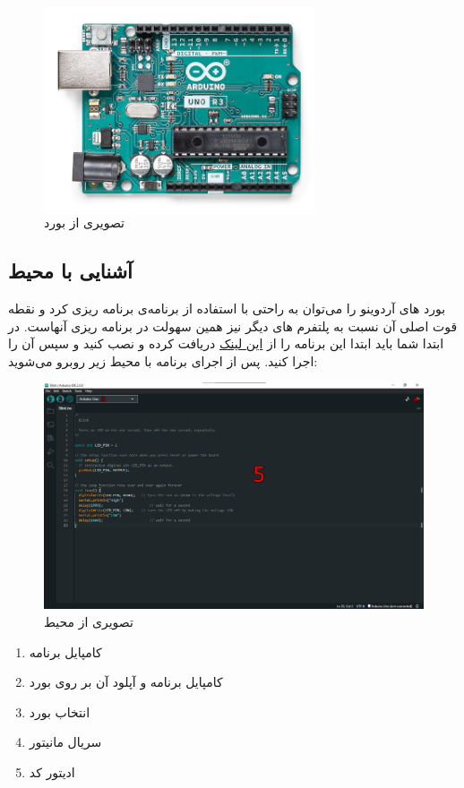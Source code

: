\begin{figure}[h]
    \centering
    \includegraphics[width=8cm]{ArdUno.png}
    \caption{تصویری از بورد }
    \label{fig:arduno}
\end{figure}

\subsection{آشنایی با محیط }
بورد های آردوینو را می‌توان به راحتی با استفاده از برنامه‌ی  برنامه ریزی کرد و نقطه قوت اصلی آن نسبت به پلتفرم های دیگر نیز همین سهولت در برنامه ریزی آنهاست. در ابتدا شما باید ابتدا این برنامه را از \href{https://www.arduino.cc/en/software}{این لینک} دریافت کرده و نصب کنید و سپس آن را اجرا کنید.
پس از اجرای برنامه با محیط زیر روبرو می‌شوید:

\begin{figure}[h]
    \centering
    \includegraphics[width=16cm]{arduinoide1.png}
    \caption{تصویری از محیط }
    \label{fig:ardunoide}
\end{figure}

\begin{enumerate}
    \item کامپایل برنامه
    \item کامپایل برنامه و آپلود آن بر روی بورد
    \item انتخاب بورد
    \item سریال مانیتور
    \item ادیتور کد
\end{enumerate}


